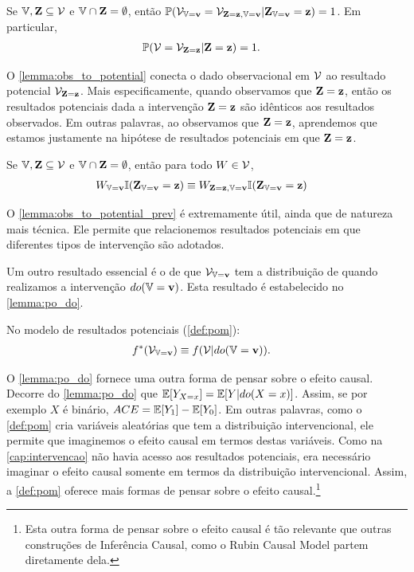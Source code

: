 \begin{lemma} 
 \label{lemma:obs_to_potential}
 Se ${\mathbb V}, {\mathbf{Z}} \subseteq {\mathcal V}$ e
 ${\mathbb V} \cap {\mathbf{Z}} = \emptyset$, então
 ${\mathbb P}({\mathcal V}_{{\mathbb V}={\mathbf{v}}} = {\mathcal V}_{{\mathbf{Z}}={\mathbf{z}}, {\mathbb V}={\mathbf{v}}}|{\mathbf{Z}}_{{\mathbb V}={\mathbf{v}}}={\mathbf{z}}) = 1$.
 Em particular,
 \begin{align*}
  {\mathbb P}({\mathcal V} = {\mathcal V}_{{\mathbf{Z}}={\mathbf{z}}}|{\mathbf{Z}} = {\mathbf{z}}) &= 1.
 \end{align*}
\end{lemma}

O \cref{lemma:obs_to_potential} conecta
o dado observacional em ${\mathcal V}$ ao
resultado potencial ${\mathcal V}_{{\mathbf{Z}}={\mathbf{z}}}$.
Mais especificamente, quando 
observamos que ${\mathbf{Z}}={\mathbf{z}}$, então
os resultados potenciais dada a
intervenção ${\mathbf{Z}}={\mathbf{z}}$ são
idênticos aos resultados observados.
Em outras palavras,
ao observamos que ${\mathbf{Z}}={\mathbf{z}}$, aprendemos que
estamos justamente na hipótese
de resultados potenciais em que ${\mathbf{Z}}={\mathbf{z}}$.

\begin{lemma}
 \label{lemma:obs_to_potential_prev}
 Se ${\mathbb V}, {\mathbf{Z}} \subseteq {\mathcal V}$ e
 ${\mathbb V} \cap {\mathbf{Z}} = \emptyset$, então
 para todo $W \in {\mathcal V}$,
 \begin{align*}
  W_{{\mathbb V}={\mathbf{v}}} {\mathbb I}({\mathbf{Z}}_{{\mathbb V}={\mathbf{v}}} = {\mathbf{z}})
  &\equiv W_{{\mathbf{Z}} = {\mathbf{z}}, {\mathbb V}={\mathbf{v}}} {\mathbb I}({\mathbf{Z}}_{{\mathbb V}={\mathbf{v}}} = {\mathbf{z}})
 \end{align*}
\end{lemma}

O \cref{lemma:obs_to_potential_prev} é extremamente útil,
ainda que de natureza mais técnica.
Ele permite que relacionemos resultados potenciais em que
diferentes tipos de intervenção são adotados.

Um outro resultado essencial é
o de que ${\mathcal V}_{{\mathbb V}={\mathbf{v}}}$ tem
a distribuição de quando
realizamos a intervenção $do({\mathbb V}={\mathbf{v}})$.
Esta resultado é estabelecido
no \cref{lemma:po_do}.

\begin{lemma}
 \label{lemma:po_do}
 No modelo de resultados potenciais (\cref{def:pom}):
 \begin{align*}
  f^*({\mathcal V}_{{\mathbb V}={\mathbf{v}}})
  &\equiv f({\mathcal V}|do({\mathbb V}={\mathbf{v}})).
 \end{align*}
\end{lemma}

O \cref{lemma:po_do} fornece 
uma outra forma de pensar sobre o efeito causal.
Decorre do \cref{lemma:po_do} que
${\mathbb E}[Y_{X=x}] = {\mathbb E}[Y|do(X=x)]$. Assim,
se por exemplo $X$ é binário,
${ACE} = {\mathbb E}[Y_1] - {\mathbb E}[Y_0]$.
Em outras palavras, 
como o \cref{def:pom} cria 
variáveis aleatórias que tem a distribuição intervencional,
ele permite que imaginemos o efeito causal
em termos destas variáveis.
Como na \cref{cap:intervencao} 
não havia acesso aos resultados potenciais, 
era necessário imaginar o efeito causal
somente em termos da distribuição intervencional.
Assim, a \cref{def:pom} oferece
mais formas de pensar sobre o efeito causal.\footnote{
 Esta outra forma de pensar sobre o efeito causal é
 tão relevante que outras construções de Inferência Causal,
 como o Rubin Causal Model \citep{Holland1986} partem
 diretamente dela.
}

